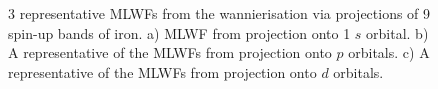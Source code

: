 \begin{itemize}
\begin{figure}[h!]
	\hspace{1.5cm}
	\centering
	\hspace{1.5cm}
	\centering
	\caption{3 representative MLWFs from the wannierisation via projections of 9 spin-up bands of iron. a) MLWF from projection onto 1 $s$ orbital. b) A representative of the MLWFs from projection onto $p$ orbitals. c) A representative of the MLWFs from projection onto $d$ orbitals.}\label{fig8.5}
	\end{figure}



\end{itemize}
